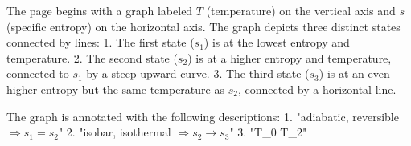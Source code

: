 The page begins with a graph labeled \( T \) (temperature) on the vertical axis and \( s \) (specific entropy) on the horizontal axis. The graph depicts three distinct states connected by lines:  
1. The first state (\( s_1 \)) is at the lowest entropy and temperature.  
2. The second state (\( s_2 \)) is at a higher entropy and temperature, connected to \( s_1 \) by a steep upward curve.  
3. The third state (\( s_3 \)) is at an even higher entropy but the same temperature as \( s_2 \), connected by a horizontal line.  

The graph is annotated with the following descriptions:  
1. "adiabatic, reversible \( \Rightarrow s_1 = s_2 \)"  
2. "isobar, isothermal \( \Rightarrow s_2 \rightarrow s_3 \)"  
3. "T_0 \rightarrow T_2"